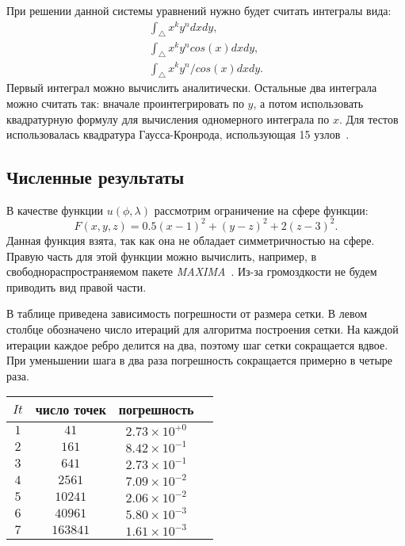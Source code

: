 \documentclass[a4paper]{article}
\begin{document}
При решении данной системы уравнений нужно будет считать интегралы вида:
\begin{equation*}
\begin{split}
\int_\bigtriangleup x^k y^n dx dy,\\
\int_\bigtriangleup x^k y^n cos(x) dx dy,\\
\int_\bigtriangleup x^k y^n / cos(x) dx dy.
\end{split}
\end{equation*}
Первый интеграл можно вычислить аналитически. Остальные два интеграла
можно считать так: вначале проинтегрировать по $y$, а потом использовать
квадратурную формулу для вычисления одномерного интеграла по $x$. Для
тестов использовалась квадратура Гаусса-Кронрода, использующая 15
узлов~\cite{kronrod}.

\subsection*{Численные результаты}
В качестве функции $u(\phi,\lambda)$ рассмотрим ограничение на сфере
функции:
\begin{equation*}
F(x,y,z)=0.5(x-1)^2+(y-z)^2+2(z-3)^2.
\end{equation*}
Данная функция взята, так как она не обладает симметричностью на
сфере. Правую часть для этой функции можно вычислить, например, в
свободнораспространяемом пакете {\it MAXIMA}~\cite{maxima}. Из-за громоздкости не
будем приводить вид правой части. 

В таблице приведена зависимость погрешности от размера сетки. В левом
столбце обозначено число итераций для алгоритма построения сетки. На
каждой итерации каждое ребро делится на два, поэтому шаг сетки
сокращается вдвое. При уменьшении шага в два раза погрешность
сокращается примерно в четыре раза.
\begin{center}
\begin{tabular}{| c | c | c | c |}
\hline
$It$ & число точек & погрешность \\
\hline
$1$ & $41$     & $2.73\times10^{+0}$ \\
$2$ & $161$    & $8.42\times10^{-1}$ \\
$3$ & $641$    & $2.73\times10^{-1}$ \\
$4$ & $2561$   & $7.09\times10^{-2}$ \\
$5$ & $10241$  & $2.06\times10^{-2}$ \\
$6$ & $40961$  & $5.80\times10^{-3}$ \\
$7$ & $163841$ & $1.61\times10^{-3}$ \\
\hline
\end{tabular}
\end{center}
\end{document}
